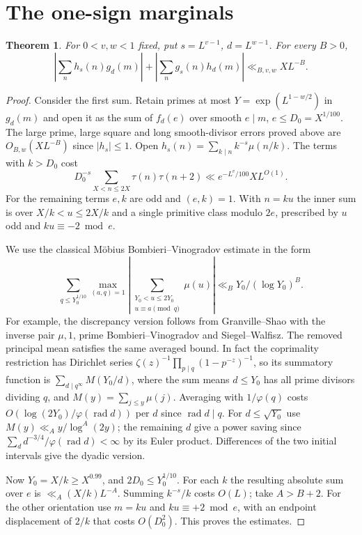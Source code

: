 \documentclass[11pt]{article}
\newtheorem{theorem}{Theorem}[section]
\newcommand{\rad}{\operatorname{rad}}
\begin{document}
\section{The one-sign marginals}

\begin{theorem}\label{marginal}
For $0<v,w<1$ fixed, put $s=L^{v-1}$, $d=L^{w-1}$. For every
$B>0$,
\[
 \left|\sum_{n}h_s(n)g_d(m)\right|
 +\left|\sum_{n}g_s(n)h_d(m)\right|
 \ll_{B,v,w} X L^{-B}.
\]
\end{theorem}

\begin{proof}
Consider the first sum. Retain primes at most $Y=\exp(L^{1-w/2})$
in $g_d(m)$ and open it as the sum of $f_d(e)$ over smooth
$e\mid m$, $e\le D_0=X^{1/100}$. The large prime, large square and
long smooth-divisor errors proved above are $O_{B,w}(XL^{-B})$
since $|h_s|\le1$. Open $h_s(n)=\sum_{k\mid n}k^{-s}\mu(n/k)$.
The terms with $k>D_0$ cost
\[
 D_0^{-s}\sum_{X<n\le2X}\tau(n)\tau(n+2)
 \ll e^{-L^v/100}X L^{O(1)} .
\]
For the remaining terms $e,k$ are odd and $(e,k)=1$. With $n=k u$
the inner sum is over $X/k<u\le2X/k$ and a single primitive
class modulo $2e$, prescribed by $u$ odd and $ku\equiv-2\bmod e$.

We use the classical M\"obius Bombieri--Vinogradov estimate in the
form
\[\sum_{q\le Y_0^{1/10}}\max_{(a,q)=1}\left|\sum_{\substack{Y_0<u\le2Y_0\\u\equiv a\pmod q}}\mu(u)\right|\ll_B Y_0/(\log Y_0)^B.\]
For example,
the discrepancy version follows from Granville--Shao
\cite[Theorem 1.1]{GS} with the inverse pair $\mu,1$, prime
Bombieri--Vinogradov and Siegel--Walfisz. The removed principal
mean satisfies the same averaged bound. In fact the coprimality
restriction has Dirichlet series $\zeta(z)^{-1}
\prod_{p\mid q}(1-p^{-z})^{-1}$, so its summatory function is
$\sum_{d\mid q^\infty}M(Y_0/d)$, where the sum
means $d\le Y_0$ has all prime divisors dividing $q$, and
$M(y)=\sum_{j\le y}\mu(j)$. Averaging with $1/\varphi(q)$ costs
$O(\log(2Y_0)/\varphi(\rad d))$ per $d$ since $\rad d\mid q$.
For $d\le\sqrt{Y_0}$ use $M(y)\ll_A y/\log^A(2y)$; the remaining
$d$ give a power saving since
$\sum_d d^{-3/4}/\varphi(\rad d)<\infty$ by its Euler product.
Differences of the two initial intervals give the dyadic version.

Now $Y_0=X/k\ge X^{0.99}$, and $2D_0\le Y_0^{1/10}$.
For each $k$ the resulting absolute sum over $e$ is
$\ll_A(X/k)L^{-A}$. Summing $k^{-s}/k$ costs $O(L)$; take
$A>B+2$. For the other orientation use $m=ku$ and
$ku\equiv +2\bmod e$, with an endpoint displacement of $2/k$
that costs $O(D_0^2)$. This proves the estimates.
\end{proof}
\end{document}
